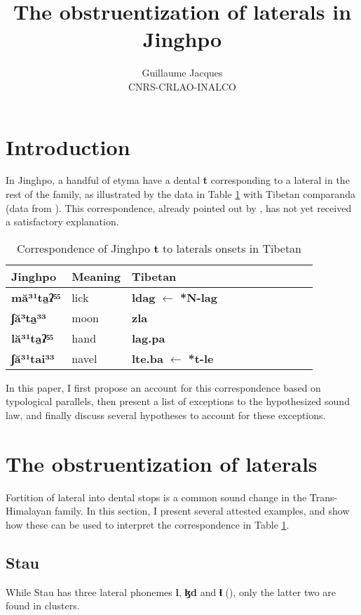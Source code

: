 \documentclass[oneside,a4paper,11pt]{article}
\newcommand{\ipa}[1]{{\phon\textbf{#1}}}
\begin{document}
 
\title{The obstruentization of laterals in Jinghpo}
\author{Guillaume Jacques\\ CNRS-CRLAO-INALCO}
\maketitle

\section*{Introduction}
In Jinghpo, a handful of etyma have a dental \ipa{t} corresponding to a lateral in the rest of the family, as illustrated by the data in Table  \ref{tab:mada} with Tibetan comparanda (data from \citealt{xu83jingpo}). This correspondence, already pointed out by \citet[50-63]{matisoff03}, has not yet received a satisfactory explanation.
 

\begin{table}[H]
\caption{Correspondence of Jinghpo \ipa{t} to laterals onsets in Tibetan} \centering \label{tab:mada}
\begin{tabular}{lllllllllll}
\toprule
Jinghpo & Meaning & Tibetan \\
\midrule
\ipa{mă³¹ta̱ʔ⁵⁵} &lick& \ipa{ldag} $\leftarrow$ \ipa{*N-lag} \\
\ipa{ʃă³ta̱³³}	&moon&	\ipa{zla} \\
\ipa{lă³¹ta̱ʔ⁵⁵}	&hand&	\ipa{lag.pa} \\
\ipa{ʃă³¹tai³³}	&navel&	\ipa{lte.ba} $\leftarrow$ \ipa{*t-le} \\
\bottomrule
\end{tabular}
\end{table}

In this paper, I first propose an account for this correspondence based on typological parallels, then present a list of exceptions to the hypothesized sound law, and finally discuss several hypotheses to account for these exceptions.

\section{The obstruentization of laterals}
Fortition of lateral into dental stops is a common sound change in the Trans-Himalayan family. In this section, I present several attested examples, and show how these can be used to interpret the correspondence in Table \ref{tab:mada}.

\subsection{Stau}
While Stau has three lateral phonemes \ipa{l}, \ipa{ɮd} and \ipa{ɬ} (\citealt{jacques17stau}), only the latter two are found in clusters. 
\end{document}
